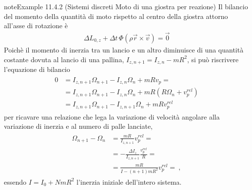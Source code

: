 \documentclass[letterpaper,10pt,italian]{jupyterBook}
\begin{document}
\begin{sphinxadmonition}{note}{Example 11.4.2 (Sistemi discreti \sphinxhyphen{} Moto di una giostra per reazione)}
\sphinxAtStartPar
Il bilancio del momento della quantità di moto rispetto al centro della giostra attorno all’asse di rotazione è
\begin{equation*}
\begin{split}\Delta L_{0,z} + \Delta t \, \Phi(\rho \vec{r} \times \vec{v}) = \vec{0}\end{split}
\end{equation*}
\sphinxAtStartPar
Poichè il momento di inerzia tra un lancio e un altro diminuisce di una quantità costante dovuta al lancio di una pallina,  \(I_{z,n+1} = I_{z,n} - m R^2\), si può riscrivere l’equazione di bilancio
\begin{equation*}
\begin{split}\begin{aligned}
  0 & = I_{z,n+1} \Omega_{n+1} - I_{z,n} \Omega_n + m R v_p =  \\
    & = I_{z,n+1} \Omega_{n+1} - I_{z,n} \Omega_n + m R ( R \Omega_n + v_p^{rel} ) \\
    & = I_{z,n+1} \Omega_{n+1} - I_{z,n+1} \Omega_n + m R v_p^{rel}
\end{aligned}\end{split}
\end{equation*}
\sphinxAtStartPar
per ricavare una relazione che lega la variazione di velocità angolare alla variazione di inerzia e al numero di palle lanciate,
\begin{equation*}
\begin{split}\begin{aligned}
  \Omega_{n+1} - \Omega_n & =  \frac{m R}{I_{z,n+1}} v_p^{rel} = \\
                          & = - \frac{\Delta I_{z}}{I_{z,n+1}} \frac{v_p^{rel}}{R} = \\
                          & =  \frac{m R}{I - (n+1) mR^2} v_p^{rel} = \ ,
\end{aligned}\end{split}
\end{equation*}
\sphinxAtStartPar
essendo \(I = I_0 + N m R^2\) l’inerzia iniziale dell’intero sistema.
\end{sphinxadmonition}
\label{ch/mechanics/dynamics-eom-open:mechanics:dynamics:open:ex:rockets}
\end{document}
